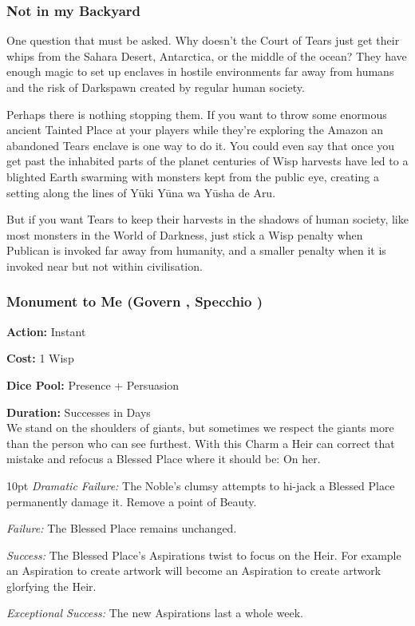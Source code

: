 \bigsidebarstart

\subsubsection*{Not in my Backyard}

One question that must be asked. Why doesn't the Court of Tears just get their whips from the Sahara Desert, Antarctica, or the middle of the ocean? They have enough magic to set up enclaves in hostile environments far away from humans and the risk of Darkspawn created by regular human society. 

Perhaps there is nothing stopping them. If you want to throw some enormous ancient Tainted Place at your players while they're exploring the Amazon an abandoned Tears enclave is one way to do it. You could even say that once you get past the inhabited parts of the planet centuries of Wisp harvests have led to a blighted Earth swarming with monsters kept from the public eye, creating a setting along the lines of Y\={u}ki Y\={u}na wa Y\={u}sha de Aru. 

But if you want Tears to keep their harvests in the shadows of human society, like most monsters in the World of Darkness, just stick a Wisp penalty when Publican is invoked far away from humanity, and a smaller penalty when it is invoked near but not within civilisation. 

\bigsidebarend

\subsubsection*{Monument to Me (Govern \textbullet\textbullet\textbullet, Specchio \textbullet\textbullet\textbullet)}

\noindent \textbf{Action:} Instant

\noindent \textbf{Cost:} 1 Wisp

\noindent \textbf{Dice Pool:} Presence + Persuasion

\noindent \textbf{Duration:} Successes in Days \\

\noindent We stand on the shoulders of giants, but sometimes we respect the giants more than the person who can see furthest. With this Charm a Heir can correct that mistake and refocus a Blessed Place where it should be: On her. 

\begin{myindentpar}{10pt} \emph{Dramatic Failure:} The Noble's clumsy attempts to hi-jack a Blessed Place permanently damage it. Remove a point of Beauty. 

\emph{Failure:} The Blessed Place remains unchanged.

\emph{Success:} The Blessed Place's Aspirations twist to focus on the Heir. For example an Aspiration to create artwork will become an Aspiration to create artwork glorfying the Heir. 

\emph{Exceptional Success:}	The new Aspirations last a whole week.

\end{myindentpar}

